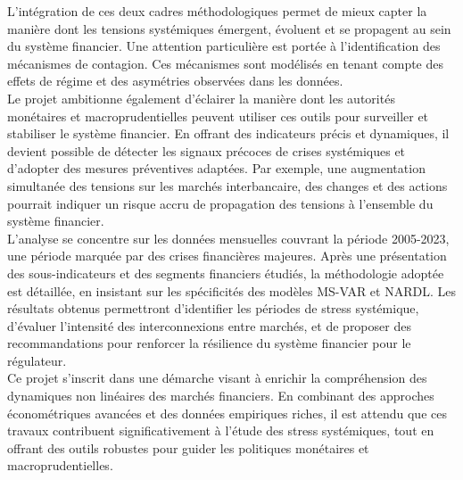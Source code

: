 \begin{sloppypar}
L’intégration de ces deux cadres méthodologiques permet de mieux capter la manière dont les tensions systémiques émergent, évoluent et se propagent au sein du système financier. Une attention particulière est portée à l’identification des mécanismes de contagion. Ces mécanismes sont modélisés en tenant compte des effets de régime et des asymétries observées dans les données.\\

Le projet ambitionne également d’éclairer la manière dont les autorités monétaires et macroprudentielles peuvent utiliser ces outils pour surveiller et stabiliser le système financier. En offrant des indicateurs précis et dynamiques, il devient possible de détecter les signaux précoces de crises systémiques et d’adopter des mesures préventives adaptées. Par exemple, une augmentation simultanée des tensions sur les marchés interbancaire, des changes et des actions pourrait indiquer un risque accru de propagation des tensions à l’ensemble du système financier.\\

L’analyse se concentre sur les données mensuelles couvrant la période 2005-2023, une période marquée par des crises financières majeures. Après une présentation des sous-indicateurs et des segments financiers étudiés, la méthodologie adoptée est détaillée, en insistant sur les spécificités des modèles MS-VAR et NARDL. Les résultats obtenus permettront d’identifier les périodes de stress systémique, d’évaluer l’intensité des interconnexions entre marchés, et de proposer des recommandations pour renforcer la résilience du système financier  pour le régulateur.\\

Ce projet s’inscrit dans une démarche visant à enrichir la compréhension des dynamiques non linéaires des marchés financiers. En combinant des approches économétriques avancées et des données empiriques riches, il est attendu que ces travaux contribuent significativement à l’étude des stress systémiques, tout en offrant des outils robustes pour guider les politiques monétaires et macroprudentielles.

\end{sloppypar}